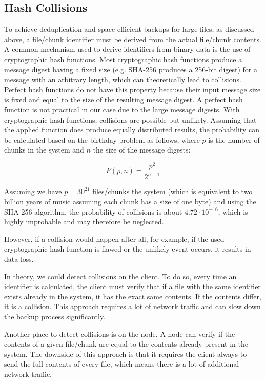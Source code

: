\subsection{Hash Collisions}\label{sec:hash-collisions}
To achieve deduplication and space-efficient backups for large files, as discussed above, a file/chunk identifier must be derived from the actual file/chunk contents. 
A common mechanism used to derive identifiers from binary data is the use of cryptographic hash functions. Most cryptographic hash functions produce a message digest having a fixed size (e.g. SHA-256\cite{sha-256} produces a 256-bit digest) for a message with an arbitrary length, which can theoretically lead to collisions.
Perfect hash functions do not have this property because their input message size is fixed and equal to the size of the resulting message digest. A perfect hash function is not practical in our case due to the large message digests.
With cryptographic hash functions, collisions are possible but unlikely. Assuming that the applied function does produce equally distributed results, the probability can be calculated based on the birthday problem\cite{birthday-attack} as follows, where $p$ is the number of chunks in the system and $n$ the size of the message digests:

\[
P(p, n) = \frac{p^2}{2^{n+1}}
\]

Assuming we have $p=30^{21}$ files/chunks the system (which is equivalent to two billion years of music assuming each chunk has a size of one byte\cite{seagate-zetabyte}) and using the SHA-256 algorithm, the probability of collisions is about $4.72 \cdot 10^{-16}$, which is highly improbable and may therefore be neglected.

However, if a collision would happen after all, for example, if the used cryptographic hash function is flawed or the unlikely event occurs, it results in data loss.

In theory, we could detect collisions on the \gls{client}. To do so, every time an identifier is calculated, the \gls{client} must verify that if a file with the same identifier exists already in the system, it has the exact same contents. If the contents differ, it is a collision. This approach requires a lot of network traffic and can slow down the backup process significantly.

Another place to detect collisions is on the \gls{node}. A \gls{node} can verify if the contents of a given file/chunk are equal to the contents already present in the system. The downside of this approach is that it requires the \gls{client} always to send the full contents of every file, which means there is a lot of additional network traffic.

